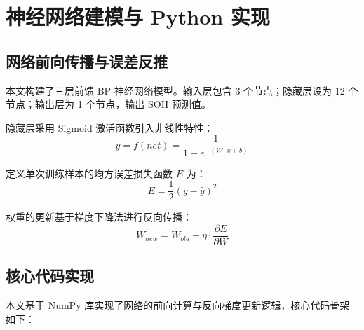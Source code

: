 \documentclass[twocolumn,10pt,a4paper,twoside]{ctexart}
\begin{document}
\section{神经网络建模与 Python 实现}

\subsection{网络前向传播与误差反推}
本文构建了三层前馈 BP 神经网络模型。输入层包含 3 个节点；隐藏层设为 12 个节点；输出层为 1 个节点，输出 SOH 预测值。

隐藏层采用 Sigmoid 激活函数引入非线性特性：
\begin{equation}
    y = f(net) = \frac{1}{1 + e^{-(W \cdot x + b)}}
\end{equation}

定义单次训练样本的均方误差损失函数 $E$ 为：
\begin{equation}
    E = \frac{1}{2} (y - \hat{y})^2
\end{equation}

权重的更新基于梯度下降法进行反向传播：
\begin{equation}
    W_{new} = W_{old} - \eta \cdot \frac{\partial E}{\partial W}
\end{equation}

\subsection{核心代码实现}
本文基于 NumPy 库实现了网络的前向计算与反向梯度更新逻辑，核心代码骨架如下：
\end{document}
